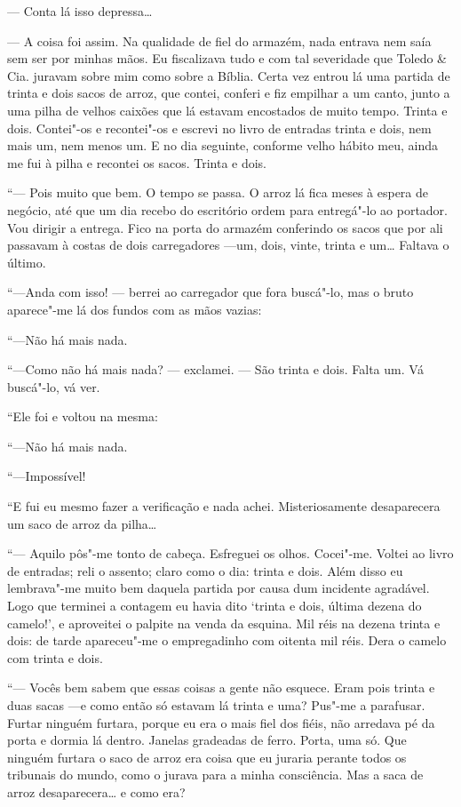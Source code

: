 --- Conta lá isso depressa\ldots{}

--- A coisa foi assim. Na qualidade de fiel do armazém, nada entrava nem
saía sem ser por minhas mãos. Eu fiscalizava tudo e com tal severidade
que Toledo \& Cia. juravam sobre mim como sobre a Bíblia. Certa vez
entrou lá uma partida de trinta e dois sacos de arroz, que contei,
conferi e fiz empilhar a um canto, junto a uma pilha de velhos caixões
que lá estavam encostados de muito tempo. Trinta e dois. Contei"-os e
recontei"-os e escrevi no livro de entradas trinta e dois, nem mais um,
nem menos um. E no dia seguinte, conforme velho hábito meu, ainda me fui
à pilha e recontei os sacos. Trinta e dois.

``--- Pois muito que bem. O tempo se passa. O arroz lá fica meses à
espera de negócio, até que um dia recebo do escritório ordem para
entregá"-lo ao portador. Vou dirigir a entrega. Fico na porta do armazém
conferindo os sacos que por ali passavam à costas de dois carregadores
---um, dois, vinte, trinta e um\ldots{} Faltava o último.

``---Anda com isso! --- berrei ao carregador que fora buscá"-lo, mas o
bruto aparece"-me lá dos fundos com as mãos vazias:

``---Não há mais nada.

``---Como não há mais nada? --- exclamei. --- São trinta e dois. Falta
um. Vá buscá"-lo, vá ver.

``Ele foi e voltou na mesma:

``---Não há mais nada.

``---Impossível!

``E fui eu mesmo fazer a verificação e nada achei. Misteriosamente
desaparecera um saco de arroz da pilha\ldots{}

``--- Aquilo pôs"-me tonto de cabeça. Esfreguei os olhos. Cocei"-me.
Voltei ao livro de entradas; reli o assento; claro como o dia: trinta e
dois. Além disso eu lembrava"-me muito bem daquela partida por causa dum
incidente agradável. Logo que terminei a contagem eu havia dito `trinta
e dois, última dezena do camelo!', e aproveitei o palpite na venda da
esquina. Mil réis na dezena trinta e dois: de tarde apareceu"-me o
empregadinho com oitenta mil réis. Dera o camelo com trinta e dois.

``--- Vocês bem sabem que essas coisas a gente não esquece. Eram pois
trinta e duas sacas ---e como então só estavam lá trinta e uma? Pus"-me a
parafusar. Furtar ninguém furtara, porque eu era o mais fiel dos fiéis,
não arredava pé da porta e dormia lá dentro. Janelas gradeadas de ferro.
Porta, uma só. Que ninguém furtara o saco de arroz era coisa que eu
juraria perante todos os tribunais do mundo, como o jurava para a minha
consciência. Mas a saca de arroz desaparecera\ldots{} e como era?

